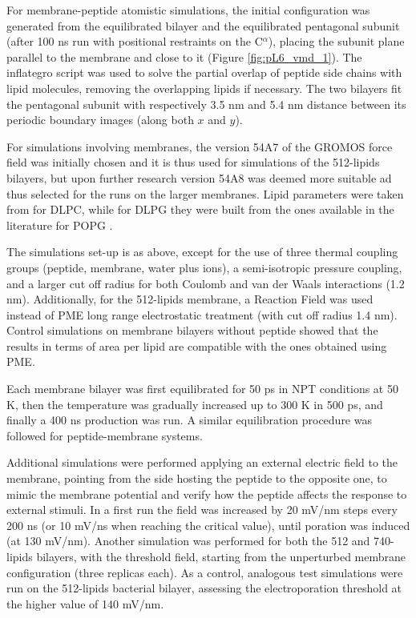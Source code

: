 For membrane-peptide atomistic simulations, the initial configuration was generated from the equilibrated bilayer and the equilibrated pentagonal subunit (after 100 ns run with positional restraints on the C$^\alpha$), placing the subunit plane parallel to the membrane and close to it (Figure \ref{fig:pL6_vmd_1}).
%
The inflategro script \citep{Kandt2007} was used to solve the partial overlap of peptide side chains with lipid molecules, removing the overlapping lipids if necessary.
%
The two bilayers fit the pentagonal subunit with respectively 3.5 nm and 5.4 nm distance between its periodic boundary images (along both $x$ and $y$).

For simulations involving membranes, the version 54A7 of the GROMOS force field \citep{Schmid2011} was initially chosen and it is thus used for simulations of the 512-lipids bilayers, but upon further research version 54A8 \citep{Oostenbrink2005, Reif2013} was deemed more suitable ad thus selected for the runs on the larger membranes. Lipid parameters were taken from \citep{PogerOrig} for DLPC, while for DLPG they were built from the ones available in the literature for POPG \citep{Kukol2009}.

The simulations set-up is as above, except for the use of three thermal coupling groups (peptide, membrane, water plus ions), a semi-isotropic pressure coupling, and a larger cut off radius for both Coulomb and van der Waals interactions (1.2 nm). Additionally, for the 512-lipids membrane, a Reaction Field \citep{Tironi1995} was used instead of PME long range electrostatic treatment (with cut off radius 1.4 nm). Control simulations on membrane bilayers without peptide showed that the results in terms of area per lipid are compatible with the ones obtained using PME.

Each membrane bilayer was first equilibrated for 50 ps in NPT conditions at 50 K, then the temperature was gradually increased up to 300 K in 500 ps, and finally a 400 ns production was run. A similar equilibration procedure was followed for peptide-membrane systems.

Additional simulations were performed applying an external electric field to the membrane, pointing from the side hosting the peptide to the opposite one, to mimic the membrane potential and verify how the peptide affects the response to external stimuli.
%
In a first run the field was increased by 20 mV/nm steps every 200 ns (or 10 mV/ns when reaching the critical value), until poration was induced (at 130 mV/nm).
%
Another simulation was performed for both the 512 and 740-lipids bilayers, with the threshold field, starting from the unperturbed membrane configuration (three replicas each).
%
As a control, analogous test simulations were run on the 512-lipids bacterial bilayer, assessing the electroporation threshold at the higher value of 140 mV/nm.

